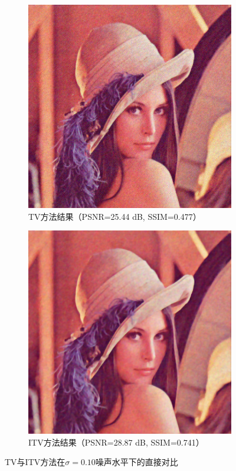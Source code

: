 \documentclass[a4paper,12pt]{ctexart}
\begin{document}
\begin{figure}[H]
\centering
\begin{subfigure}[t]{0.45\textwidth}
    \includegraphics[width=\textwidth]{img/multi_noise_analysis_20250609_204619/noise_level_0.10/tv_PSNR25.44_SSIM0.477.png}
    \caption{TV方法结果（PSNR=25.44 dB, SSIM=0.477）}
\end{subfigure}
\hfill
\begin{subfigure}[t]{0.45\textwidth}
    \includegraphics[width=\textwidth]{img/multi_noise_analysis_20250609_204619/noise_level_0.10/itv_PSNR28.87_SSIM0.741.png}
    \caption{ITV方法结果（PSNR=28.87 dB, SSIM=0.741）}
\end{subfigure}
\caption{TV与ITV方法在$\sigma=0.10$噪声水平下的直接对比}
\label{fig:tv_itv_direct}
\end{figure}
\end{document}
